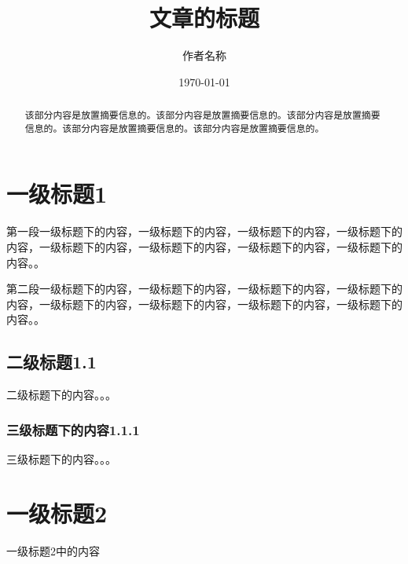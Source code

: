 \documentclass{article} %
\title{文章的标题}  %
\author{作者名称}   %
\date{\today}       %
\begin{document}
\maketitle

\begin{abstract}
    该部分内容是放置摘要信息的。该部分内容是放置摘要信息的。该部分内容是放置摘要信息的。该部分内容是放置摘要信息的。该部分内容是放置摘要信息的。
\end{abstract}


\section{一级标题1}
第一段一级标题下的内容，一级标题下的内容，一级标题下的内容，一级标题下的内容，一级标题下的内容，一级标题下的内容，一级标题下的内容，一级标题下的内容。。\par
第二段一级标题下的内容，一级标题下的内容，一级标题下的内容，一级标题下的内容，一级标题下的内容，一级标题下的内容，一级标题下的内容，一级标题下的内容。。
\subsection{二级标题1.1}
二级标题下的内容。。。
\subsubsection{三级标题下的内容1.1.1}
三级标题下的内容。。。
\section{一级标题2}
一级标题2中的内容\par
\end{document}
